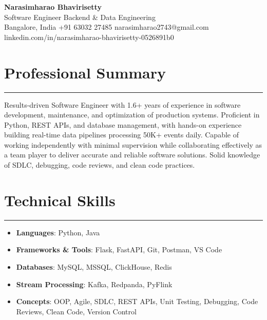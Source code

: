 \documentclass[10pt]{article}
\begin{document}
\begin{center}
  {\huge\textbf{Narasimharao Bhavirisetty}}\\[3pt]
  Software Engineer \textbullet{} Backend \& Data Engineering \\[3pt]
  Bangalore, India \textbullet{} +91 63032 27485 \textbullet{} narasimharao2743@gmail.com \textbullet{} linkedin.com/in/narasimharao-bhavirisetty-0526891b0
\end{center}

\vspace{4pt}

\section*{Professional Summary}
\vspace{1pt}\hrule\vspace{4pt}
Results-driven Software Engineer with 1.6+ years of experience in software development, maintenance, and optimization of production systems. Proficient in Python, REST APIs, and database management, with hands-on experience building real-time data pipelines processing 50K+ events daily. Capable of working independently with minimal supervision while collaborating effectively as a team player to deliver accurate and reliable software solutions. Solid knowledge of SDLC, debugging, code reviews, and clean code practices.

\section*{Technical Skills}
\vspace{1pt}\hrule\vspace{4pt}
\begin{itemize}
  \item \textbf{Languages}: Python, Java
  \item \textbf{Frameworks \& Tools}: Flask, FastAPI, Git, Postman, VS Code
  \item \textbf{Databases}: MySQL, MSSQL, ClickHouse, Redis
  \item \textbf{Stream Processing}: Kafka, Redpanda, PyFlink
  \item \textbf{Concepts}: OOP, Agile, SDLC, REST APIs, Unit Testing, Debugging, Code Reviews, Clean Code, Version Control
\end{itemize}
\end{document}
